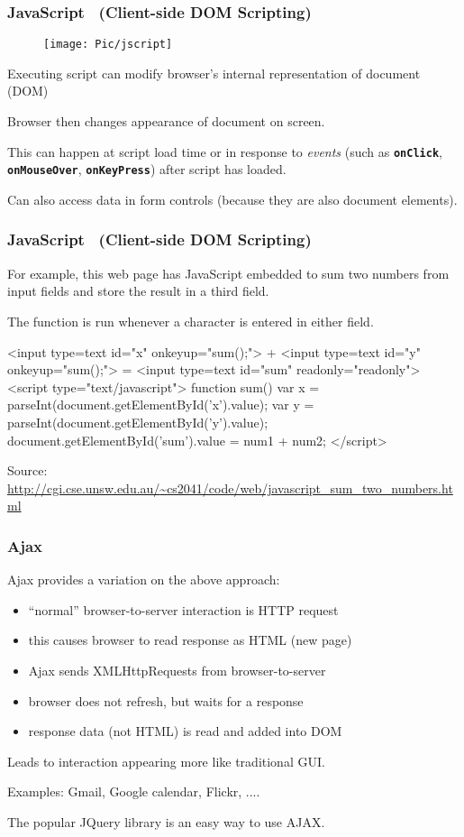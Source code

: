 \begin{frame}
\frametitle{JavaScript ~{\small (Client-side DOM Scripting)}}


    \begin{figure}
        \centering
        \texttt{[image: Pic/jscript]}
    \end{figure}
Executing script can modify browser's internal representation of document (DOM)

Browser then changes appearance of document on screen.

This can happen at script load time or in response to {\em{events}}
(such as \textbf{\tt{onClick}}, \textbf{\tt{onMouseOver}}, \textbf{\tt{onKeyPress}}) after
script has loaded.

Can also access data in form controls {\small (because they are also document elements)}.
\end{frame}

\begin{frame}[fragile]
\frametitle{JavaScript ~{\small (Client-side DOM Scripting)}}
For example, this web page has JavaScript embedded to sum two numbers from input fields and 
store the result in a third  field.

The function is run whenever a character is entered in either field.
\begin{perl}
<input type=text id="x" onkeyup="sum();"> +
<input type=text id="y" onkeyup="sum();"> =
<input type=text id="sum" readonly="readonly">
<script type="text/javascript">
function sum() {
  var x = parseInt(document.getElementById('x').value);
  var y = parseInt(document.getElementById('y').value);
  document.getElementById('sum').value = num1 + num2;
}
</script>
\end{perl}

{\tiny Source:  \href{http://cgi.cse.unsw.edu.au/~cs2041/code/web/javascript_sum_two_numbers.html}{http://cgi.cse.unsw.edu.au/{\textasciitilde}cs2041/code/web/javascript\_sum\_two\_numbers.html}}
\end{frame}

\begin{frame}
\frametitle{Ajax}
Ajax provides a variation on the above approach:
\begin{itemize}
\item  ``normal'' browser-to-server interaction is HTTP request
\item  this causes browser to read response as HTML {\small (new page)}
\item  Ajax sends XMLHttpRequests from browser-to-server
\item  browser does not refresh, but waits for a response
\item  response data {\small (not HTML)} is read and added into DOM
\end{itemize}
Leads to interaction appearing more like traditional GUI.

Examples: Gmail, Google calendar, Flickr, ....

The popular JQuery library is an easy way to use AJAX.
\end{frame}

